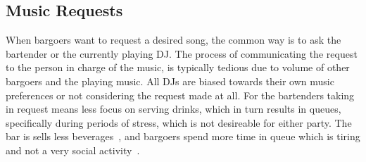 \subsection{Music Requests}

When bargoers want to request a desired song, the common way is to ask the bartender or the currently playing DJ. The process of communicating the request to the person in charge of the music, is typically tedious due to volume of other bargoers and the playing music. All DJs are biased towards their own music preferences or not considering the request made at all. For the bartenders taking in request means less focus on serving drinks, which in turn results in queues, specifically during periods of stress, which is not desireable for either party. The bar is sells less beverages~\cite{Queues gives lower income}, and bargoers spend more time in queue which is tiring and not a very social activity~\cite{Queues er træls}.
